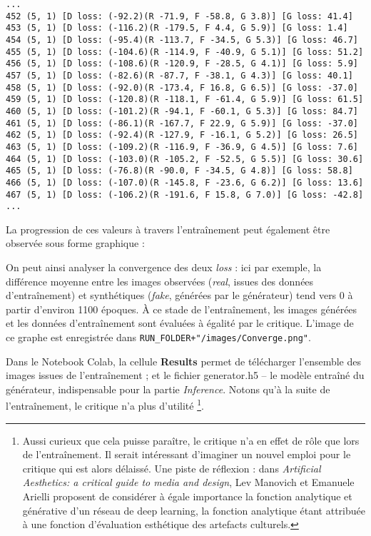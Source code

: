 \documentclass[
]{article}
\begin{document}
\begin{verbatim}
...
452 (5, 1) [D loss: (-92.2)(R -71.9, F -58.8, G 3.8)] [G loss: 41.4]
453 (5, 1) [D loss: (-116.2)(R -179.5, F 4.4, G 5.9)] [G loss: 1.4]
454 (5, 1) [D loss: (-95.4)(R -113.7, F -34.5, G 5.3)] [G loss: 46.7]
455 (5, 1) [D loss: (-104.6)(R -114.9, F -40.9, G 5.1)] [G loss: 51.2]
456 (5, 1) [D loss: (-108.6)(R -120.9, F -28.5, G 4.1)] [G loss: 5.9]
457 (5, 1) [D loss: (-82.6)(R -87.7, F -38.1, G 4.3)] [G loss: 40.1]
458 (5, 1) [D loss: (-92.0)(R -173.4, F 16.8, G 6.5)] [G loss: -37.0]
459 (5, 1) [D loss: (-120.8)(R -118.1, F -61.4, G 5.9)] [G loss: 61.5]
460 (5, 1) [D loss: (-101.2)(R -94.1, F -60.1, G 5.3)] [G loss: 84.7]
461 (5, 1) [D loss: (-86.1)(R -167.7, F 22.9, G 5.9)] [G loss: -37.0]
462 (5, 1) [D loss: (-92.4)(R -127.9, F -16.1, G 5.2)] [G loss: 26.5]
463 (5, 1) [D loss: (-109.2)(R -116.9, F -36.9, G 4.5)] [G loss: 7.6]
464 (5, 1) [D loss: (-103.0)(R -105.2, F -52.5, G 5.5)] [G loss: 30.6]
465 (5, 1) [D loss: (-76.8)(R -90.0, F -34.5, G 4.8)] [G loss: 58.8]
466 (5, 1) [D loss: (-107.0)(R -145.8, F -23.6, G 6.2)] [G loss: 13.6]
467 (5, 1) [D loss: (-106.2)(R -191.6, F 15.8, G 7.0)] [G loss: -42.8]
...
\end{verbatim}

La progression de ces valeurs à travers l'entraînement peut également être observée sous forme graphique :

On peut ainsi analyser la convergence des deux \emph{loss} : ici par exemple, la différence moyenne entre les images observées (\emph{real}, issues des données d'entraînement) et synthétiques (\emph{fake}, générées par le générateur) tend vers 0 à partir d'environ 1100 époques. À ce stade de l'entraînement, les images générées et les données d'entraînement sont évaluées à égalité par le critique. L'image de ce graphe est enregistrée dans \texttt{RUN\_FOLDER+"/images/Converge.png"}.

Dans le Notebook Colab, la cellule \textbf{Results} permet de télécharger l'ensemble des images issues de l'entraînement ; et le fichier generator.h5 -- le modèle entraîné du générateur, indispensable pour la partie \emph{Inference}. Notons qu'à la suite de l'entraînement, le critique n'a plus d'utilité \footnote{Aussi curieux que cela puisse paraître, le critique n'a en effet de rôle que lors de l'entraînement. Il serait intéressant d'imaginer un nouvel emploi pour le critique qui est alors délaissé. Une piste de réflexion : dans \emph{Artificial Aesthetics: a critical guide to media and design}, Lev Manovich et Emanuele Arielli proposent de considérer à égale importance la fonction analytique et générative d'un réseau de deep learning, la fonction analytique étant attribuée à une fonction d'évaluation esthétique des artefacts culturels.}.
\end{document}
